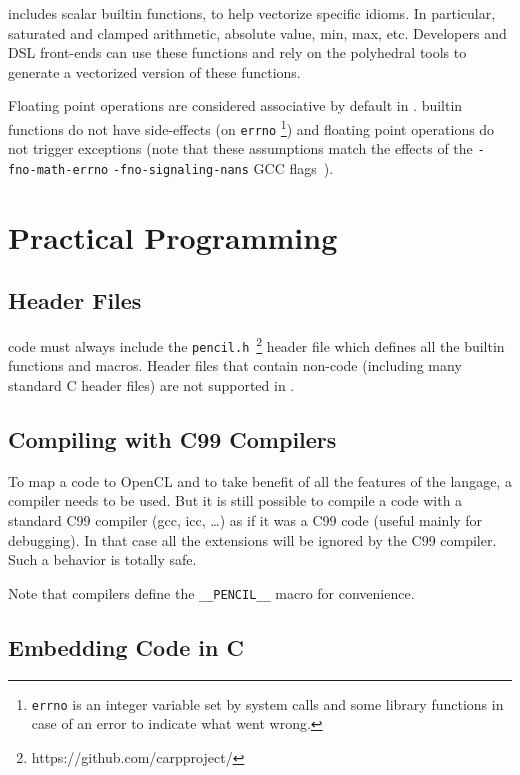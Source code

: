 \pencil includes scalar builtin functions, to help vectorize specific
idioms. In particular, saturated and clamped arithmetic, absolute
value, min, max, etc.  Developers and DSL front-ends can use these
functions and rely on the polyhedral tools to generate a vectorized
version of these functions.

Floating point operations are considered associative by default in \pencil.
\pencil builtin functions do not have side-effects (on \texttt{errno}
\footnote{\texttt{errno} is an integer variable set by system calls and
some library functions in case of an error to indicate what went wrong.})
and floating point operations do not trigger exceptions (note that these
assumptions match the effects of the \texttt{-fno-math-errno}
\texttt{-fno-signaling-nans} GCC flags~\cite{gccguide}).

\section{Practical \pencil Programming}

\subsection{Header Files}
\pencil code must always include
the \texttt{pencil.h}~\footnote{https://github.com/carpproject/} header file
which defines all the \pencil builtin functions and macros.
Header files that contain non-\pencil code (including many standard C header
files) are not supported in \pencil.


\subsection{Compiling \pencil with C99 Compilers}

To map a \pencil code to OpenCL and to take benefit of all the features
of the \pencil langage, a \pencil compiler needs to be used.
But it is still possible to compile a \pencil code with a standard C99
compiler (gcc, icc, \dots) as if it was a C99 code (useful mainly for
debugging).
In that case all the \pencil extensions will be ignored by the C99
compiler.  Such a behavior is totally safe.

Note that \pencil compilers define the \lstinline!__PENCIL__! macro
for convenience.


\subsection{Embedding \pencil Code in C}
\label{sec:pencil-as-c-ext}

